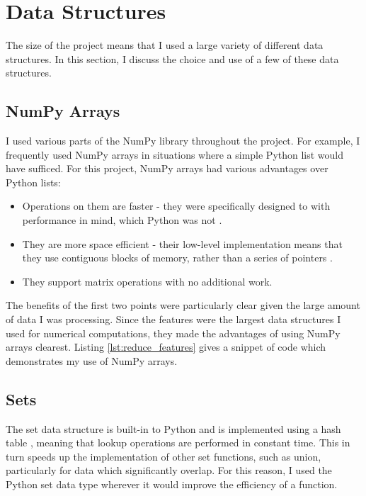 \documentclass[12pt,a4paper,twoside,openright]{report}
\begin{document}
\section{Data Structures} \label{impl-structures}

The size of the project means that I used a large variety of different data structures. In this section, I discuss the choice and use of a few of these data structures.

\subsection{NumPy Arrays}

I used various parts of the NumPy library throughout the project. For example, I frequently used NumPy arrays in situations where a simple Python list would have sufficed. For this project, NumPy arrays had various advantages over Python lists:
\begin{itemize}
	\item Operations on them are faster - they were specifically designed to with performance in mind, which Python was not \cite{numpyspeed}.
	\item They are more space efficient - their low-level implementation means that they use contiguous blocks of memory, rather than a series of pointers \cite{numpymanual}.
	\item They support matrix operations with no additional work.
\end{itemize}

The benefits of the first two points were particularly clear given the large amount of data I was processing. Since the features were the largest data structures I used for numerical computations, they made the advantages of using NumPy arrays clearest. Listing \ref{lst:reduce_features} gives a snippet of code which demonstrates my use of NumPy arrays.

\subsection{Sets}

The set data structure is built-in to Python and is implemented using a hash table \cite{pythonsetdocs}, meaning that lookup operations are performed in constant time. This in turn speeds up the implementation of other set functions, such as union, particularly for data which significantly overlap. For this reason, I used the Python set data type wherever it would improve the efficiency of a function.
\end{document}
